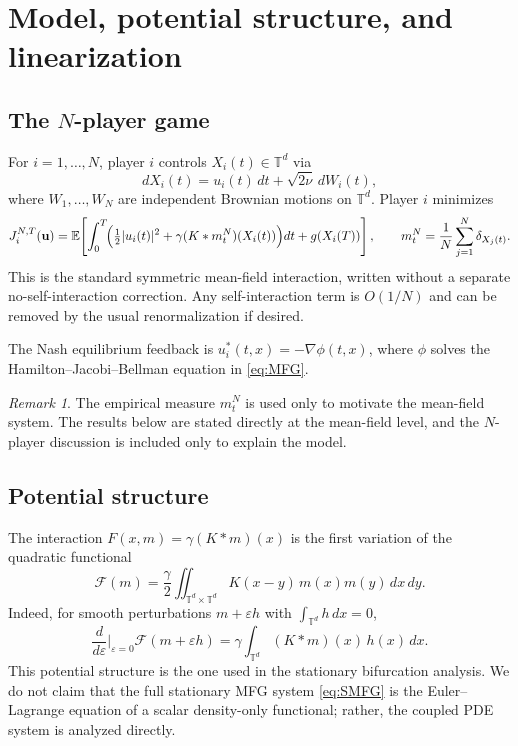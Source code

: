 \documentclass[11pt]{amsart}
\theoremstyle{definition}
\theoremstyle{remark}
\newtheorem{remark}[theorem]{Remark}
\newcommand{\Td}{\mathbb{T}^d}
\newcommand{\E}{\mathbb{E}}
\newcommand{\cF}{\mathcal{F}}
\newcommand{\grad}{\nabla}
\newcommand{\eps}{\varepsilon}
\begin{document}
\section{Model, potential structure, and linearization}
\label{sec:setup}

\subsection{The $N$-player game}
\label{sub:N-game}

For $i=1,\dots,N$, player $i$ controls $X_i(t)\in\Td$ via
\[
dX_i(t)=u_i(t)\,dt+\sqrt{2\nu}\,dW_i(t),
\]
where $W_1,\dots,W_N$ are independent Brownian motions on $\Td$. Player $i$ minimizes
\begin{equation}
\label{eq:cost}
J_i^{N,T}(\mathbf u)
= \E\!\left[\int_0^T \!\Bigl(\tfrac12|u_i(t)|^2+\gamma(K*m_t^N)(X_i(t))\Bigr)dt
+g(X_i(T))\right],
\qquad
m_t^N=\frac1N\sum_{j=1}^N \delta_{X_j(t)}.
\end{equation}
This is the standard symmetric mean-field interaction, written without a separate no-self-interaction correction. Any self-interaction term is $O(1/N)$ and can be removed by the usual renormalization if desired.

The Nash equilibrium feedback is $u_i^*(t,x)=-\grad\phi(t,x)$, where $\phi$ solves the Hamilton--Jacobi--Bellman equation in \eqref{eq:MFG}.

\begin{remark}
The empirical measure $m_t^N$ is used only to motivate the mean-field system. The results below are stated directly at the mean-field level, and the $N$-player discussion is included only to explain the model.
\end{remark}

\subsection{Potential structure}
\label{sub:potential}

The interaction $F(x,m)=\gamma(K*m)(x)$ is the first variation of the quadratic functional
\begin{equation}
\label{eq:energy}
\cF(m) = \frac{\gamma}{2} \iint_{\Td\times\Td} K(x-y)\,m(x)m(y)\,dx\,dy.
\end{equation}
Indeed, for smooth perturbations $m+\eps h$ with $\int_{\Td}h\,dx=0$,
\[
\frac{d}{d\eps}\bigg|_{\eps=0}\cF(m+\eps h)
=
\gamma\int_{\Td}(K*m)(x)\,h(x)\,dx.
\]
This potential structure is the one used in the stationary bifurcation analysis. We do not claim that the full stationary MFG system \eqref{eq:SMFG} is the Euler--Lagrange equation of a scalar density-only functional; rather, the coupled PDE system is analyzed directly.
\end{document}
